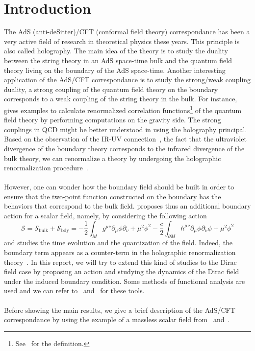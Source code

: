 \section{Introduction}
The AdS (anti-deSitter)/CFT (conformal field theory) correspondance has been a very active field of research in theoretical physics these years. 
This principle is also called holography.
The main idea of the theory is to study the duality between the string theory in an AdS space-time bulk and the quantum field theory living on the boundary of the AdS space-time.
Another interesting application of the AdS/CFT correspondance is to study the strong/weak coupling duality, \ie
a strong coupling of the quantum field theory on the boundary corresponds to a weak coupling of the string theory in the bulk. 
For instance,~\cite{Skenderis2002} gives examples to calculate renormalized correlation functions\footnote{
See~\eg\cite{Peskin1995} for the definition.
} of the quantum field theory by performing computations on the gravity side.
The strong couplings in QCD might be better understood in using the holography principal. 
Based on the observation of the IR-UV connection~\cite{Susskind1998}, 
\ie the fact that the ultraviolet divergence of the boundary theory corresponds to the infrared divergence of the bulk theory, 
we can renormalize a theory by undergoing the holographic renormalization procedure~\cite{Skenderis2002}. \\\\
%
However, one can wonder how the boundary field should be built in order to ensure that the two-point function constructed on the boundary has the behaviors that correspond to the bulk field. 
\cite{Zahn2016} proposes thus an additional boundary action for a scalar field, namely, by considering the following action
\begin{equation*}
\mathcal{S} = \mathcal{S}_{\mathrm{bulk}} + \mathcal{S}_{\mathrm{bdy}} = 
-\frac 1 2 \int_M g^{\mu\nu} \partial_\mu \phi \partial_{\nu} + 
\mu^2\phi^2 - \frac c 2 \int_{\partial M}h^{\mu\nu}\partial_\mu\phi\partial_\nu\phi + \mu^2\phi^2
\end{equation*}
and studies the time evolution and the quantization of the field.
Indeed, the boundary term appears as a counter-term in the holographic renormalization theory~\cite{Skenderis2002}.
In this report, we will try to extend this kind of studies to the Dirac field case by proposing an action and studying the dynamics of the Dirac field under the induced boundary condition.
Some methods of functional analysis are used and we can refer to~\cite{Reed1981} and~\cite{Reed1975} for these tools. \\\\
%
Before showing the main results, 
we give a brief description of the AdS/CFT correspondance by using the example of a massless scalar field from~\cite{Witten1998} and~\cite{Skenderis2002}. 
%
